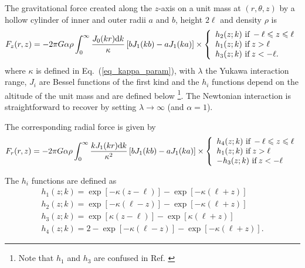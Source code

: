 \documentclass[12pt]{iopart}
\begin{document}
The gravitational force created along the $z$-axis on a unit mass at $(r,\theta,z)$ by a hollow cylinder of inner and outer radii $a$ and $b$, height $2\ell$ and density $\rho$ is \cite{lockerbie96}
\begin{equation} \label{eq_fz1}
F_z(r,z) = -2\pi G \alpha \rho \int_0^\infty \frac{J_0(kr) {\rm d}k}{\kappa} \left[b J_1(kb) - a J_1(ka)\right] \times
\left\{
\begin{array}{l}
h_2(z; k) \,\, {\rm if } \, -\ell \leqslant z \leqslant \ell \\
h_1(z; k) \,\, {\rm if } \, z > \ell \\ 
h_3(z; k) \,\, {\rm if } \, z < -\ell. \\
\end{array}
\right.
\end{equation}
where $\kappa$ is defined in Eq.~(\ref{eq_kappa_param}), with $\lambda$ the Yukawa interaction range, $J_i$ are Bessel functions of the first kind and the $h_i$ functions depend on the altitude of the unit mass and are defined below \footnote{Note that $h_1$ and $h_3$ are confused in Ref. \cite{lockerbie96}}. The Newtonian interaction is straightforward to recover by setting $\lambda \rightarrow \infty$ (and $\alpha=1$).

The corresponding radial force is given by
\begin{equation} \label{eq_fr1}
F_r(r,z) = -2\pi G \alpha \rho \int_0^\infty \frac{kJ_1(kr) {\rm d}k}{\kappa^2} \left[b J_1(kb) - a J_1(ka)\right] \times
\left\{
\begin{array}{l}
h_4(z; k) \,\, {\rm if } \, -\ell \leqslant z \leqslant \ell \\
h_1(z; k) \,\, {\rm if } \, z > \ell \\ 
-h_3(z; k) \,\, {\rm if } \, z < -\ell \\
\end{array}
\right.
\end{equation}

The $h_i$ functions are defined as
\begin{equation}
\begin{array}{l}
h_1(z;k) = \exp[-\kappa(z-\ell)] - \exp[-\kappa(\ell+z)] \\
h_2(z;k) = \exp[-\kappa(\ell-z)] - \exp[-\kappa(\ell+z)] \\
h_3(z;k) = \exp[\kappa(z-\ell)] - \exp[\kappa(\ell+z)] \\
h_4(z;k) = 2 - \exp[-\kappa(\ell-z)] - \exp[-\kappa(\ell+z)].
\end{array}
\end{equation}
\end{document}
